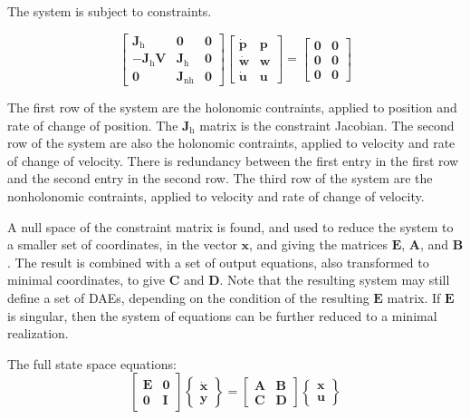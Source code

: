The system is subject to constraints.

\[
\begin{bmatrix}
\mathbf{J}_\textrm{h} & {\bm 0} & {\bm 0}\\-{\mathbf J}_\textrm{h}{\mathbf V} & {\mathbf J}_\textrm{h} & {\bm 0}\\ {\bm 0} & {\mathbf J}_\textrm{nh} & {\bm 0}
\end{bmatrix}
\begin{bmatrix}
\dot{\bm p} & {\bm p} \\ \dot{\bm w} & {\bm w} \\ \dot{\bm u} & {\bm u}
\end{bmatrix}
=\begin{bmatrix}
{\bm 0} & {\bm 0}\\{\bm 0} & {\bm 0}\\{\bm 0} & {\bm 0}
\end{bmatrix}
\]

The first row of the system are the holonomic contraints, applied to position and rate of change of position.  The $\mathbf{J}_\text{h}$ matrix is the constraint Jacobian.  The second row of the system are also the holonomic contraints, applied to velocity and rate of change of velocity.  There is redundancy between the first entry in the first row and the second entry in the second row.  The third row of the system are the nonholonomic contraints, applied to velocity and rate of change of velocity.

A null space of the constraint matrix is found, and used to reduce the system to a smaller set of coordinates, in the vector ${\bm x}$, and giving the matrices ${\mathbf E}$, ${\mathbf A}$, and ${\mathbf B}$.  The result is combined with a set of output equations, also transformed to minimal coordinates, to give ${\mathbf C}$ and ${\mathbf D}$.  Note that the resulting system may still define a set of DAEs, depending on the condition of the resulting ${\mathbf E}$ matrix.  If ${\mathbf E}$ is singular, then the system of equations can be further reduced to a minimal realization.






The full state space equations:
\[
\begin{bmatrix}
{\mathbf E} & {\bm 0} \\ {\bm 0} & {\mathbf I}
\end{bmatrix}
\begin{Bmatrix}
\dot{\bm x}\\ {\bm y}
\end{Bmatrix}
=\begin{bmatrix}
\mathbf{A} & \mathbf{B} \\ \mathbf{C} & \mathbf{D}
\end{bmatrix}
\begin{Bmatrix}
{\bm x}\\ {\bm u}\end{Bmatrix}
\]

